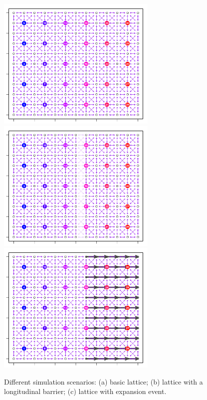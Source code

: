 \documentclass[12pt]{article}
\begin{document}
\begin{figure}
	\centering
			{\includegraphics[width=3in,height=2.5in]{figs/basic_lattice.png}}
			{\includegraphics[width=3in,height=2.5in]{figs/barrier_lattice.png}}
			{\includegraphics[width=3in,height=2.5in]{figs/expansion_lattice.png}}
	\caption{Different simulation scenarios: (a) basic lattice; (b) lattice with a longitudinal barrier; (c) lattice with expansion event.}\label{sfig:sim_scenarios}
\end{figure}
\end{document}
